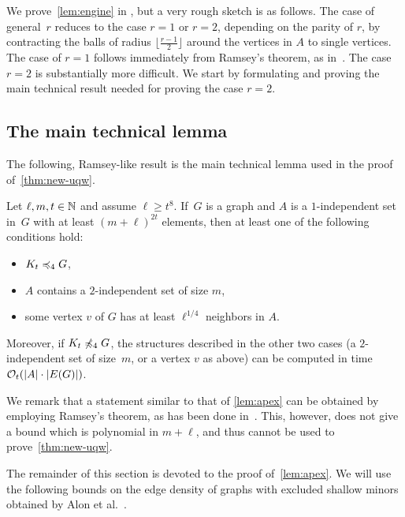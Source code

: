 We prove~\cref{lem:engine} in , but  a very rough sketch is as follows.
The  case of general~$r$ reduces to the case $r=1$ or $r=2$, depending on the parity of $r$,
by contracting the balls of radius $\lfloor \frac {r-1} 2\rfloor $ around the vertices in $A$ to single vertices.
The case of $r=1$ follows immediately from Ramsey's theorem, as in~\cite{nevsetvril2011nowhere}.
The case $r=2$ is substantially more difficult.
We start by formulating and proving the main technical result needed for proving the case $r=2$.







\subsection{The main technical lemma}
\label{sec:main-tech}

The following, Ramsey-like result is the main technical lemma used in the proof of~\cref{thm:new-uqw}. 

\begin{lemma}\label{lem:apex}
Let $\ell,m,t\in \mathbb{N}$ and assume $\ell\geq t^{8}$. 
If~$G$ is a graph and $A$ is a $1$-independent set in~$G$
with at least $(m+\ell)^{2t}$ elements,
then at least one of the following conditions hold:
\begin{itemize}
  \item $K_t\preccurlyeq_{4} G$,
\item  $A$ contains a $2$-independent set of size $m$, 
\item  some vertex $v$ of $G$
has at least $\ell^{1/4}$ neighbors in $A$.
\end{itemize}
Moreover, if $K_t\not\preccurlyeq_4G$, the
structures described in the other two cases (a $2$-independent set 
of size~$m$, or a vertex $v$ as above) can be 
computed in time $\mathcal{O}_t(|A|\cdot |E(G)|)$. 
\end{lemma}
We remark that a statement similar to that of \cref{lem:apex}
can be obtained by employing Ramsey's theorem, as has been done in~\cite{nevsetvril2011nowhere}. This, however, 
does not give a bound which is polynomial in $m+\ell$, and thus cannot be used to prove~\cref{thm:new-uqw}.

\medskip
The remainder of this section is devoted to the proof of~\cref{lem:apex}.
We will use the following bounds on the edge density
of graphs with excluded shallow minors obtained
by Alon et al.~\cite{alon2003turan}. 

